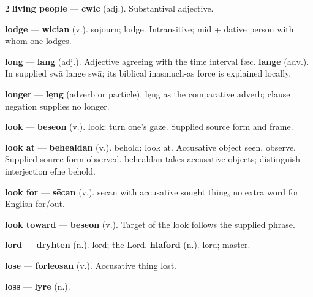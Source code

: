 \begin{multicols}{2}
\textbf{living people} — \textbf{cwic} (adj.). Substantival adjective.\par
\textbf{lodge} — \textbf{wician} (v.). sojourn; lodge. Intransitive; mid + dative person with whom one lodges.\par
\textbf{long} — \textbf{lang} (adj.). Adjective agreeing with the time interval fæc. \textbf{lange} (adv.). In supplied swā lange swā; its biblical inasmuch-as force is explained locally.\par
\textbf{longer} — \textbf{lęng} (adverb or particle). lęng as the comparative adverb; clause negation supplies no longer.\par
\textbf{look} — \textbf{besēon} (v.). look; turn one's gaze. Supplied source form and frame.\par
\textbf{look at} — \textbf{behealdan} (v.). behold; look at. Accusative object seen. observe. Supplied source form observed. behealdan takes accusative objects; distinguish interjection efne behold.\par
\textbf{look for} — \textbf{sēcan} (v.). sēcan with accusative sought thing, no extra word for English for/out.\par
\textbf{look toward} — \textbf{besēon} (v.). Target of the look follows the supplied phrase.\par
\textbf{lord} — \textbf{dryhten} (n.). lord; the Lord. \textbf{hlāford} (n.). lord; master.\par
\textbf{lose} — \textbf{forlēosan} (v.). Accusative thing lost.\par
\textbf{loss} — \textbf{lyre} (n.).\par

\end{multicols}
